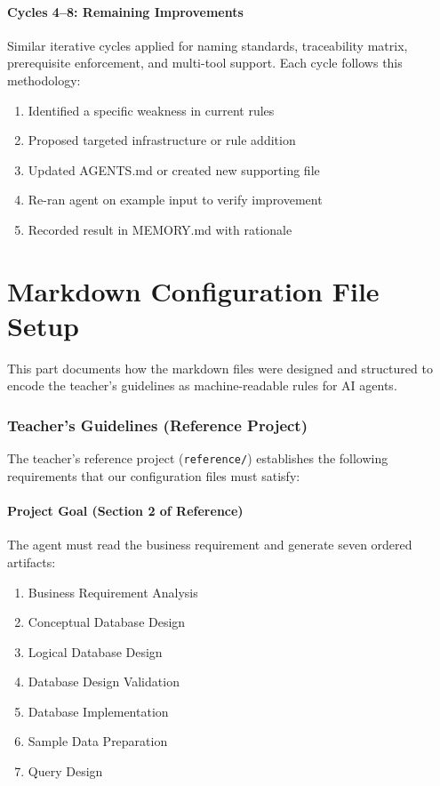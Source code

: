 \documentclass[12pt,a4paper]{article}
\begin{document}
\subsection{Cycles 4--8: Remaining Improvements}
Similar iterative cycles applied for naming standards, traceability matrix, prerequisite enforcement, and multi-tool support. Each cycle follows this methodology:
\begin{enumerate}
    \item Identified a specific weakness in current rules
    \item Proposed targeted infrastructure or rule addition
    \item Updated AGENTS.md or created new supporting file
    \item Re-ran agent on example input to verify improvement
    \item Recorded result in MEMORY.md with rationale
\end{enumerate}

\newpage


\part{Markdown Configuration File Setup}

This part documents how the markdown files were designed and structured to encode the teacher's guidelines as machine-readable rules for AI agents.

\section{Teacher's Guidelines (Reference Project)}

The teacher's reference project (\texttt{reference/}) establishes the following requirements that our configuration files must satisfy:

\subsection{Project Goal (Section 2 of Reference)}

The agent must read the business requirement and generate seven ordered artifacts:

\begin{enumerate}
    \item Business Requirement Analysis
    \item Conceptual Database Design
    \item Logical Database Design
    \item Database Design Validation
    \item Database Implementation
    \item Sample Data Preparation
    \item Query Design
\end{enumerate}
\end{document}
